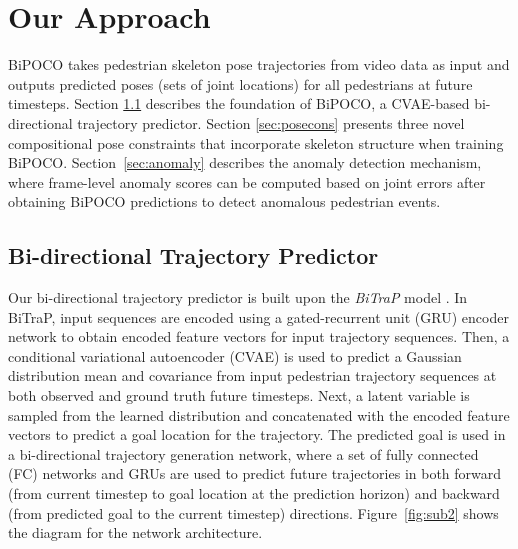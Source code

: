 \documentclass[nohyperref]{article}
\theoremstyle{plain}
\theoremstyle{definition}
\theoremstyle{remark}
\begin{document}
\vspace{-3mm}

\section{Our Approach}
\label{sec:method}
\vspace{-2mm}
BiPOCO takes pedestrian skeleton pose trajectories from video data as input and outputs predicted poses (sets of joint locations) for all pedestrians at future timesteps. Section \ref{sec:bitrap} describes the foundation of BiPOCO, a CVAE-based bi-directional trajectory predictor. Section \ref{sec:posecons} presents three novel compositional pose constraints that incorporate  skeleton structure when training BiPOCO. Section~\ref{sec:anomaly} describes the anomaly detection mechanism, where frame-level anomaly  scores can be computed based on joint errors after obtaining BiPOCO predictions to detect anomalous pedestrian events. 

\vspace{-3mm}

\subsection{Bi-directional Trajectory Predictor}
\label{sec:bitrap}
\vspace{-2mm}
Our bi-directional trajectory predictor is built upon the \textit{BiTraP} model \cite{yao2021bitrap}. In BiTraP,  input sequences are encoded using a gated-recurrent unit (GRU) encoder network to obtain encoded feature vectors for input trajectory sequences. Then, a conditional variational autoencoder (CVAE) is used to predict a Gaussian distribution mean and covariance from input pedestrian trajectory sequences at both observed and ground truth future timesteps. Next, a latent variable  is sampled from the learned distribution and concatenated with the encoded feature vectors to predict a goal location for the trajectory. The predicted goal is used in a bi-directional trajectory generation network, where a set of fully connected (FC) networks and GRUs are used to predict future trajectories in both forward (from current timestep to goal location at the prediction horizon) and backward (from predicted goal to the current timestep) directions. Figure~\ref{fig:sub2} shows the diagram for the network architecture. 
\end{document}
